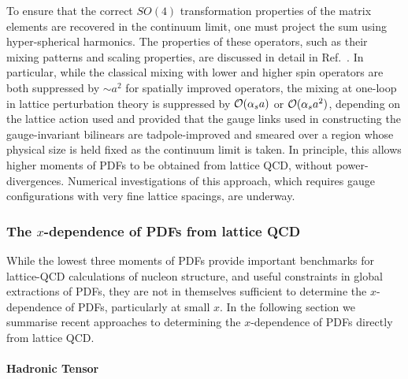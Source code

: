 To ensure that the correct $SO(4)$ transformation properties of the matrix elements are recovered in the continuum limit, one must project the sum using hyper-spherical harmonics.
%
The properties of these operators, such as their mixing patterns and scaling properties, are discussed in detail in
Ref.~\cite{Davoudi:2012ya}.
%
In particular, while the classical mixing with lower and higher spin operators are both suppressed by $\sim a^2$ for spatially improved operators, the mixing at one-loop in lattice perturbation theory is suppressed by ${\cal O}(\alpha_s a)$ or ${\cal O}(\alpha_s a^2)$, depending on the lattice action used and provided that the gauge links used in constructing the gauge-invariant bilinears are tadpole-improved and smeared over a region whose physical size is held fixed as the continuum limit is taken. In principle, this allows higher moments of PDFs to be obtained from lattice QCD, without power-divergences. Numerical investigations of this approach,
which requires gauge configurations with very fine lattice spacings, are underway.

\subsubsection{The $x$-dependence of PDFs from lattice QCD}
\label{sec:xdependence}

While the lowest three moments of PDFs provide important benchmarks for lattice-QCD calculations of nucleon structure, and useful constraints in global extractions of PDFs, they are not in themselves sufficient to determine the $x$-dependence of PDFs, particularly at small $x$.
%
In the following section we summarise recent approaches to determining the $x$-dependence of PDFs directly from lattice QCD.

\paragraph*{Hadronic Tensor} 




